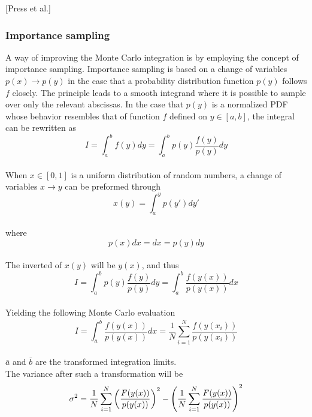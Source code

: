 \documentclass[%
reprint,
amsmath,amssymb,
aps,
]{revtex4-1}
\begin{document}
\hspace{6cm}[Press et al.] 


\subsubsection{Importance sampling} \noindent 
A way of improving the Monte Carlo integration is by employing the concept of importance sampling. Importance sampling is based on a change of variables $p(x)\rightarrow p(y)$ in the case that a probability distribution function $p(y)$ follows $f$ closely. The principle leads to a smooth integrand where it is possible to sample over only the relevant abscissas. In the case that $p(y)$ is a normalized PDF whose behavior resembles that of function $f$ defined on $y\in[a, b]$, the integral can be rewritten as  \\
\begin{equation*}
	I = \int_{a}^{b}f(y)dy = \int_{a}^{b}p(y)\dfrac{f(y)}{p(y)}dy 
\end{equation*}\vspace{2mm} \\
When $x\in[0,1]$ is a uniform distribution of random numbers, a change of variables $x\rightarrow y$ can be preformed through\vspace{2mm} \\
\begin{equation*}
	x(y) = \int_{a}^{y}p(y')dy'
\end{equation*} \\
where\vspace{2mm} \\
\begin{equation*}
	p(x)dx = dx = p(y)dy
\end{equation*}\vspace{2mm} \\
The inverted of $x(y)$ will be $y(x)$, and thus\vspace{2mm} \\
\begin{equation*}
I = \int_{a}^{b}p(y)\dfrac{f(y)}{p(y)}dy  = \int_{a}^{b}\dfrac{f(y(x))}{p(y(x))}dx
\end{equation*}\vspace{2mm} \\
Yielding the following Monte Carlo evaluation \vspace{2mm} \\
\begin{equation}\label{mcis}
	I = \int_{\bar{a}}^{\bar{b}}\dfrac{f(y(x))}{p(y(x))}dx = \dfrac{1}{N}\sum_{i=1}^{N}\dfrac{f(y(x_i))}{p(y(x_i))}
\end{equation}\vspace{2mm} \\
$\bar{a}$ and $\bar{b}$ are the transformed integration limits. \\
The variance after such a transformation will be \vspace{2mm} \\
\begin{equation}\label{mcise}
	\sigma^2 = \dfrac{1}{N}\sum_{i = 1}^{N}\qty(\dfrac{F(y(x))}{p(y(x))})^2 -\qty(\dfrac{1}{N}\sum_{i = 1}^{N}\dfrac{F(y(x))}{p(y(x))})^2
\end{equation}\\
\end{document}
